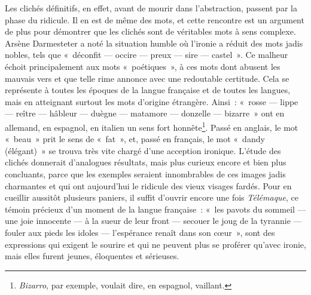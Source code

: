 \documentclass[french,twoside]{book} %
\begin{document}
Les clichés définitifs, en effet, avant de mourir dans l’abstraction, passent par la phase du ridicule. Il en est de même des mots, et cette rencontre est un argument de plus pour démontrer que les clichés sont de véritables mots à sens complexe. Arsène Darmesteter a noté la situation humble où l’ironie a réduit des mots jadis nobles, tels que « déconfit — occire — preux — sire — castel ». Ce malheur échoit principalement aux mots « poétiques », à ces mots dont abusent les mauvais vers et que telle rime annonce avec une redoutable certitude. Cela se représente à toutes les époques de la langue française et de toutes les langues, mais en atteignant surtout les mots d’origine étrangère. Ainsi : « rosse — lippe — reître — hâbleur — duègne — matamore — donzelle — bizarre » ont en allemand, en espagnol, en italien un sens fort honnête\footnote{{\itshape Bizarro}, par exemple, voulait dire, en espagnol, vaillant.}. Passé en anglais, le mot « beau » prit le sens de « fat », et, passé en français, le mot « dandy (élégant) » se trouva très vite chargé d’une acception ironique. L’étude des clichés donnerait d’analogues résultats, mais plus curieux encore et bien plus concluants, parce que les exemples seraient innombrables de ces images jadis charmantes et qui ont aujourd’hui le ridicule des vieux visages fardés. Pour en cueillir aussitôt plusieurs paniers, il suffit d’ouvrir encore une fois {\itshape Télémaque}, ce témoin précieux d’un moment de la langue française : « les pavots du sommeil — une joie innocente — à la sueur de leur front — secouer le joug de la tyrannie — fouler aux pieds les idoles — l’espérance renaît dans son cœur », sont des expressions qui exigent le sourire et qui ne peuvent plus se proférer qu’avec ironie, mais elles furent jeunes, éloquentes et sérieuses.\par
\end{document}
